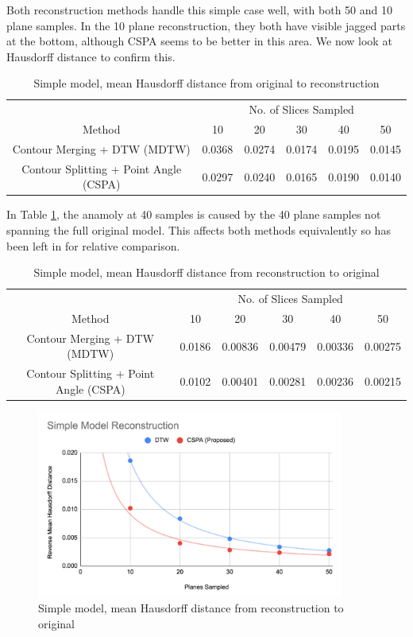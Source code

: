 \documentclass[11p, titlepage]{article}
\begin{document}
Both reconstruction methods handle this simple case well, with both 50 and 10 plane samples. In the 10 plane reconstruction, they both have visible jagged parts at the bottom, although CSPA seems to be better in this area. We now look at Hausdorff distance to confirm this.

\begin{table}[h!]
\begin{tabular}{ | c | c | c | c | c | c | }
\hline
& \multicolumn{5}{c|}{No. of Slices Sampled} \\
\cline{2-6}
Method & 10 & 20 & 30 & 40 & 50 \\
\hline
Contour Merging + DTW (MDTW) & 0.0368 & 0.0274 & 0.0174 & 0.0195 & 0.0145 \\
Contour Splitting + Point Angle (CSPA) & 0.0297 & 0.0240 & 0.0165 & 0.0190 & 0.0140 \\
\hline
\end{tabular}
\caption{Simple model, mean Hausdorff distance from original to reconstruction}
\label{table:simple_forward}
\end{table}

In Table \ref{table:simple_forward}, the anamoly at 40 samples is caused by the 40 plane samples not spanning the full original model. This affects both methods equivalently so has been left in for relative comparison.

\begin{table}[h!]
\begin{tabular}{ | c | c | c | c | c | c | }
\hline
& \multicolumn{5}{c|}{No. of Slices Sampled} \\
\cline{2-6}
Method & 10 & 20 & 30 & 40 & 50 \\
\hline
Contour Merging + DTW (MDTW) & 0.0186 & 0.00836 & 0.00479 & 0.00336 & 0.00275 \\
Contour Splitting + Point Angle (CSPA) & 0.0102 & 0.00401 & 0.00281 & 0.00236 & 0.00215 \\
\hline
\end{tabular}
\caption{Simple model, mean Hausdorff distance from reconstruction to original}
\label{table:simple_reverse}
\end{table}

\begin{figure}[h!]
\centering
\includegraphics[width=0.9\textwidth]{graphs/simple-reverse}
\caption{Simple model, mean Hausdorff distance from reconstruction to original\label{fig:simple_reverse_graph}}
\end{figure}
\end{document}
